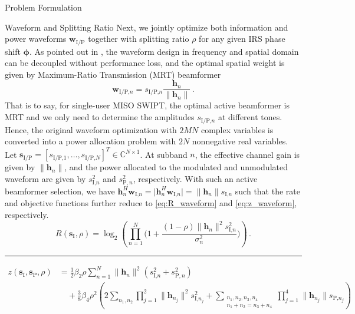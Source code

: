\documentclass[journal]{IEEEtran}
\begin{document}
\begin{section}{Problem Formulation}
		\begin{subsection}{Waveform and Splitting Ratio}
			Next, we jointly optimize both information and power waveforms $\boldsymbol{w}_{\text{I/P}}$ together with splitting ratio $\rho$ for any given IRS phase shift $\boldsymbol{\phi}$. As pointed out in \cite{Clerckx2018b}, the waveform design in frequency and spatial domain can be decoupled without performance loss, and the optimal spatial weight is given by Maximum-Ratio Transmission (MRT) beamformer
			\begin{equation}\label{eq:w_IP}
				\boldsymbol{w}_{\text{I/P,}n}=s_{\text{I/P,}n}\frac{\boldsymbol{h}_n}{\lVert{\boldsymbol{h}_n}\rVert}\,.
			\end{equation}
			That is to say, for single-user MISO SWIPT, the optimal active beamformer is MRT and we only need to determine the amplitudes $s_{\text{I/P,}n}$ at different tones. Hence, the original waveform optimization with $2MN$ complex variables is converted into a power allocation problem with $2N$ nonnegative real variables. Let $\boldsymbol{s}_{\text{I/P}}=[s_{\text{I/P,}1},\dots,s_{\text{I/P,}N}]^T \in \mathbb{C}^{N \times 1}$. At subband $n$, the effective channel gain is given by $\lVert{\boldsymbol{h}_n}\rVert$, and the power allocated to the modulated and unmodulated waveform are given by $s_{\text{I,}n}^2$ and $s_{\text{P},n}^2$, respectively. With such an active beamformer selection, we have $\boldsymbol{h}_n^H\boldsymbol{w}_{\text{I,}n}=\lvert{\boldsymbol{h}_n^H\boldsymbol{w}_{\text{I,}n}}\rvert=\lVert{\boldsymbol{h}_n}\rVert s_{\text{I,}n}$ such that the rate and objective functions further reduce to \eqref{eq:R_waveform} and \eqref{eq:z_waveform}, respectively.
			\begin{equation}\label{eq:R_waveform}
				R(\boldsymbol{s}_{\text{I}},\rho) = \log_2\left(\prod_{n=1}^N\biggl(1+\frac{(1-\rho)\lVert{\boldsymbol{h}_n}\rVert^2 s_{\text{I,}n}^2}{\sigma_n^2}\biggr)\right)\,.
			\end{equation}
			\begin{figure*}[b]
				\hrule
				\begin{align}
					z(\boldsymbol{s}_{\text{I}},\boldsymbol{s}_\text{P},\rho)
					& = \frac{1}{2}{\beta_2}{\rho} \sum_{n=1}^N \lVert{\boldsymbol{h}_n}\rVert^2(s_{\text{I,}n}^2+s_{\text{P},n}^2)\nonumber\\
					& \quad + \frac{3}{8}{\beta_4}{\rho^2} \left( 2\sum_{n_1,n_2} \prod_{j=1}^2 \lVert{\boldsymbol{h}_{n_j}}\rVert^2 s_{\text{I,}{n_j}}^2 + \sum_{\substack{{n_1},{n_2},{n_3},{n_4}\\{n_1}+{n_2}={n_3}+{n_4}}} \prod_{j=1}^4 \lVert{\boldsymbol{h}_{n_j}}\rVert s_{\text{P,}{n_j}} \right)\nonumber\\

\end{align}
\end{figure*}
\end{subsection}
\end{section}
\end{document}
